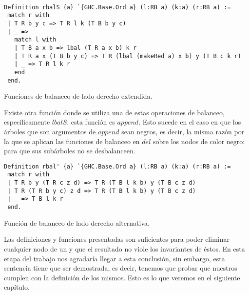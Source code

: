 \begin{listing}[!ht]
\centering
\captionsetup{justification=centering}
\begin{verbatim}

Definition rbalS {a} `{GHC.Base.Ord a} (l:RB a) (k:a) (r:RB a) :=
 match r with
 | T R b y c => T R l k (T B b y c)
 | _ =>
   match l with
   | T B a x b => lbal (T R a x b) k r
   | T R a x (T B b y c) => T R (lbal (makeRed a) x b) y (T B c k r)
   | _ => T R l k r
   end
 end.

\end{verbatim}
\caption{Funciones de balanceo de lado derecho extendida.}
\label{rbalS}
\end{listing}

Existe otra función donde se utiliza una de estas operaciones de balanceo, específicamente 
\hyperref[lbalS]{$lbalS$}, esta funci\'on es \hyperref[func_app]{$append$}. Esto sucede en el caso 
en que los \'arboles que son argumentos de \hyperref[func_app]{$append$} sean negros, es decir, la 
misma razón por la que se aplican las funciones de balanceo en \hyperref[func_del]{$del$} sobre los 
nodos de color negro: para que sus subárboles no se desbalanceen.

\begin{listing}[!ht]
\centering
\captionsetup{justification=centering}
\begin{verbatim}
Definition rbal' {a} `{GHC.Base.Ord a} (l:RB a) (k:a) (r:RB a) :=
 match r with
 | T R b y (T R c z d) => T R (T B l k b) y (T B c z d)
 | T R (T R b y c) z d => T R (T B l k b) y (T B c z d)
 | _ => T B l k r
 end.

\end{verbatim}
\caption{Funci\'on de balanceo de lado derecho alternativa.}
\label{rbal_2}
\end{listing}

Las definiciones y funciones presentadas son suficientes para poder eliminar cualquier nodo de un 
{\arn} y que el resultado no viole los invariantes de \'estos. En esta etapa del trabajo nos 
agradar\'ia llegar a esta  conclusi\'on, sin embargo, esta sentencia tiene que ser demostrada, es 
decir, tenemos que probar que nuestros {\arns} cumplen con la  definici\'on de los mismos. Esto es 
lo que veremos en el siguiente cap\'itulo.